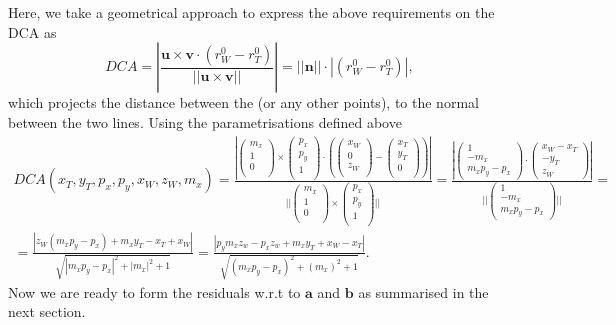 \documentclass[a4paper,11pt]{article}
\begin{document}
Here, we take a geometrical approach to express the above requirements on the DCA as
\begin{equation}
DCA = |\frac{\textbf{u} \times \textbf{v} \cdot (r^0_W - r^0_T) }{||\textbf{u} \times \textbf{v}||}| = ||\textbf{n}|| \cdot |(r^0_W - r^0_T)| ,
\end{equation}
which projects the distance between the  (or any other points), to the normal between the two lines. Using the parametrisations defined above
\begin{equation}
\begin{split}
DCA(x_T, y_T, p_x, p_y, x_W, z_W, m_x) = \frac{|\begin{pmatrix} m_x \\ 1\\  0\\\end{pmatrix} \times \begin{pmatrix} p_x\\ p_y \\  1\\\end{pmatrix} \cdot (\begin{pmatrix}x_W  \\0 \\  z_W\\\end{pmatrix} - \begin{pmatrix}x_T \\y_T  \\  0\\\end{pmatrix}) |}{||\begin{pmatrix} m_x \\ 1\\  0\\\end{pmatrix} \times \begin{pmatrix}p_x\\ p_y \\  1\\\end{pmatrix}||} =  \frac{|\begin{pmatrix} 1 \\ -m_x \\ m_xp_y - p_x  \end{pmatrix} \cdot
\begin{pmatrix} x_W-x_T \\ -y_T \\ z_W  \end{pmatrix} |}{||\begin{pmatrix} 1 \\ -m_x \\ m_xp_y - p_x  \end{pmatrix}||}  = \\
= \frac{|z_W (m_x p_y-p_x)+m_x y_T-x_T+x_W|}{\sqrt{\left| m_x p_y-p_x\right|^2+\left| m_x\right|^2+1}}
= \frac{| p_ym_xz_w-p_xz_w + m_xy_T + x_W - x_T |}{\sqrt{(m_x p_y-p_x)^2+(m_x)^2+1}}.
\label{eq:DCAGeom}
\end{split}
\end{equation}
Now we are ready to form the residuals w.r.t to $\textbf{a}$ and  $\textbf{b}$ as summarised in the next section.
\end{document}
